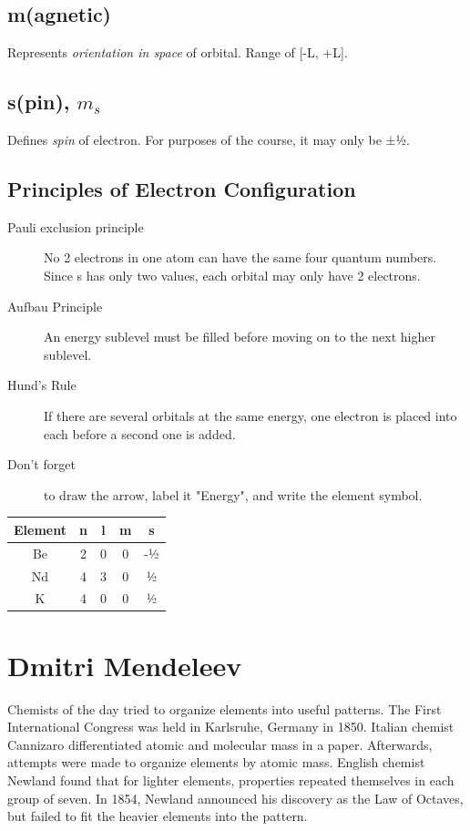 \documentclass[a4paper, 8pt]{memoir}
\begin{document}
\section{m(agnetic)}
Represents \emph{orientation in space} of orbital. Range of [-L, +L].
\section{s(pin), $m_s$}
Defines \emph{spin} of electron. For purposes of the course, it may only be ±½.
\section{Principles of Electron Configuration}
\begin{description}
\item[Pauli exclusion principle] No 2 electrons in one atom can have the same four quantum numbers. Since s has only two values, each orbital may only have 2 electrons.
\item[Aufbau Principle] An energy sublevel must be filled before moving on to the next higher sublevel.
\item[Hund's Rule] If there are several orbitals at the same energy, one electron is placed into each before a second one is added.
\item[Don't forget] to draw the arrow, label it "Energy", and write the element symbol.
\end{description}
\begin{center}
\begin{tabular}{|c|c|c|c|c|}
\hline
Element & n & l & m & s \\ \hline
Be & 2 & 0 & 0 & -½ \\ \hline
Nd & 4 & 3 & 0 & ½ \\ \hline
K & 4 & 0 & 0 & ½ \\ \hline
\end{tabular}
\end{center}
\chapter{Dmitri Mendeleev}
Chemists of the day tried to organize elements into useful patterns. The First International Congress was held in Karlsruhe, Germany in 1850. Italian chemist Cannizaro differentiated atomic and molecular mass in a paper. Afterwards, attempts were made to organize elements by atomic mass. English chemist Newland found that for lighter elements, properties repeated themselves in each group of seven. In 1854, Newland announced his discovery as the Law of Octaves, but failed to fit the heavier elements into the pattern.
\end{document}
